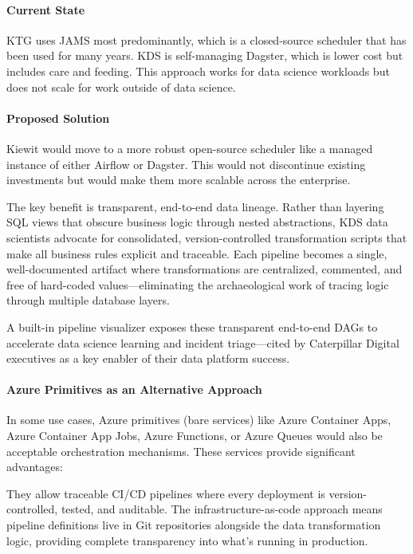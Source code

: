 \documentclass[12pt, a4paper]{article}
\begin{document}
\paragraph{Current State}
KTG uses JAMS most predominantly, which is a closed-source scheduler that has been used for many years. KDS is self-managing Dagster, which is lower cost but includes care and feeding. This approach works for data science workloads but does not scale for work outside of data science.

\paragraph{Proposed Solution}
Kiewit would move to a more robust open-source scheduler like a managed instance of either Airflow or Dagster. This would not discontinue existing investments but would make them more scalable across the enterprise.

The key benefit is transparent, end-to-end data lineage. Rather than layering SQL views that obscure business logic through nested abstractions, KDS data scientists advocate for consolidated, version-controlled transformation scripts that make all business rules explicit and traceable. Each pipeline becomes a single, well-documented artifact where transformations are centralized, commented, and free of hard-coded values—eliminating the archaeological work of tracing logic through multiple database layers.

A built-in pipeline visualizer exposes these transparent end-to-end DAGs to accelerate data science learning and incident triage—cited by Caterpillar Digital executives as a key enabler of their data platform success.

\paragraph{Azure Primitives as an Alternative Approach}
In some use cases, Azure primitives (bare services) like Azure Container Apps, Azure Container App Jobs, Azure Functions, or Azure Queues would also be acceptable orchestration mechanisms. These services provide significant advantages:

They allow traceable CI/CD pipelines where every deployment is version-controlled, tested, and auditable. The infrastructure-as-code approach means pipeline definitions live in Git repositories alongside the data transformation logic, providing complete transparency into what's running in production.
\end{document}
